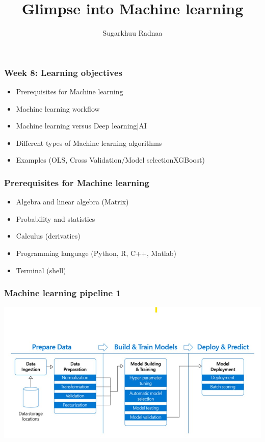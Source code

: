 \documentclass{beamer}
\title[Introduction to Python]{Glimpse into Machine learning}
\author{Sugarkhuu Radnaa}
\institute[]
{
Py4Econ in Ulaanbaatar \\ 
\medskip
\textit{py4econ@gmail.com} 
}
\date{}  %
\begin{document}
\begin{frame}
\titlepage %
\end{frame}

\begin{frame}
    \frametitle{Week 8: Learning objectives}
    \begin{itemize}
        \item Prerequisites for Machine learning 
        \item Machine learning workflow
        \item Machine learning versus Deep learning|AI
        \item Different types of Machine learning algorithms
        \item Examples (OLS, Cross Validation/Model selectionXGBoost)
    \end{itemize}
\end{frame}


\begin{frame}
    \frametitle{Prerequisites for Machine learning}
            \begin{itemize}
                \item Algebra and linear algebra (Matrix)
                \item Probability and statistics
                \item Calculus (derivaties)
                \item Programming language (Python, R, C++, Matlab)
                \item Terminal (shell)                
            \end{itemize}
\end{frame}

\begin{frame}
    \frametitle{Machine learning pipeline 1}
    \begin{center}
        \includegraphics[scale=0.5]{figures/ML_pipe.jpg}
    \end{center}
\end{frame}
\end{document}
